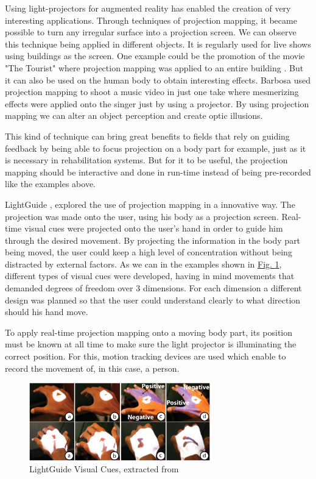 \documentclass[runningheads]{llncs}
\begin{document}
Using light-projectors for augmented reality has enabled the creation of very interesting applications. 
Through techniques of projection mapping, it became possible to turn any irregular surface into a projection screen.
We can observe this technique being applied in different objects. It is regularly used for live shows 
using buildings as the screen. One example could be the promotion of the movie "The Tourist" where 
projection mapping was applied to an entire building \cite{projectionmapping_building}. But it can 
also be used on the human body to obtain interesting effects. Barbosa \cite{projectionmapping_face} 
used projection mapping to shoot a music video in just one take where mesmerizing effects were applied 
onto the singer just by using a projector. 
By using projection mapping we can alter an object perception and create optic illusions.

This kind of technique can bring great benefits to fields that rely on guiding feedback by being able 
to focus projection on a body part for example, just as it is necessary in rehabilitation systems.
But for it to be useful, the projection mapping should be interactive and done in run-time instead of 
being pre-recorded like the examples above.

LightGuide \cite{Sodhi2012}, explored the use of projection mapping in a innovative way. 
The projection was made onto the user, using his body as a projection screen. 
Real-time visual cues were projected onto the user's hand in order to guide him through the desired movement. 
By projecting the information in the body part being moved, the user could keep a high level of concentration 
without being distracted by external factors.
As we can in the examples shown in \hyperref[fig:lightguide]{Fig. \ref{fig:lightguide}}, different types of visual cues were developed, having in mind movements that demanded degrees of freedom over 3 dimensions. 
For each dimension a different design was planned so that the user could understand clearly to what direction 
should his hand move.

To apply real-time projection mapping onto a moving body part, its 
position must be known at all time to make sure the light projector is 
illuminating the correct position. 
For this, motion tracking devices are used which enable to record the movement of, in this case, a person. 

\begin{figure}
\centering
\includegraphics[width=0.7\textwidth]{imgs/lightguide.png}
\caption{LightGuide Visual Cues, extracted from \cite{Sodhi2012}}
\label{fig:lightguide}
\end{figure}
\end{document}
